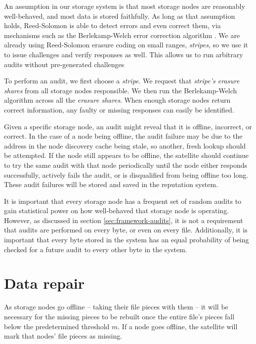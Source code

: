\documentclass[11pt,fleqn,openany]{book}
\begin{document}
An assumption in our storage system is that most storage nodes are
reasonably well-behaved, and most data is stored faithfully. As long as that
assumption holds, Reed-Solomon is able to detect errors and even correct them,
via mechanisms such as the Berlekamp-Welch error correction algorithm \cite{bw}.
We are already using Reed-Solomon erasure coding
\cite{rs} on small ranges, {\em stripes}, so we use it to issue challenges and
verify responses as well. This allows us to run arbitrary audits without
pre-generated challenges

To perform an audit, we first choose a {\em stripe}. We request that
{\em stripe's erasure shares} from all storage nodes responsible. We then run
the Berlekamp-Welch algorithm \cite{bw} across all the {\em erasure shares}. When
enough storage nodes return correct information, any faulty or missing responses
can easily be identified.

Given a specific storage node, an audit might reveal that it is offline,
incorrect, or correct. In the case of a node being offline, the audit failure
may be due to the address in the node discovery cache being stale, so another,
fresh lookup should be attempted. If the node still appears to be offline,
the satellite should continue to try the same audit with that node periodically
until the node either responds successfully, actively fails the audit, or
is disqualified from being offline too long.
These audit failures will be stored and saved in the reputation system.

It is important that every storage node has a frequent set of random audits to
gain statistical power on how well-behaved that storage node is operating. However, as
discussed in section \ref{sec:framework-audits}, it is
not a requirement that audits are performed on every byte, or even on every
file.
Additionally, it is important that every byte stored in the system has an equal
probability of being checked for a future audit to every other byte in the
system.

\section{Data repair}\label{sec:concrete-data-repair}

As storage nodes go offline -- taking their file pieces with them -- it will
be necessary for the missing pieces to be rebuilt once the entire file's pieces
fall below the predetermined threshold $m$. If a node goes offline, the
satellite will mark that nodes' file pieces as missing.
\end{document}
